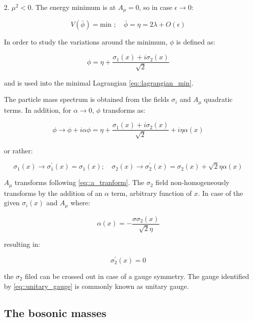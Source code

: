 2. $\mu^{2} < 0$. The energy minimum is at $A_{\mu} = 0$, so in  case $\epsilon \rightarrow 0$:

\begin{equation}
V(\bar{\phi}) = \text{min }; \quad \bar{\phi}=\eta= 2\lambda +O(\epsilon)
\end{equation}
 
 In order to study the  variations around the minimum, $\phi$ is defined as:

\begin{equation}
 \phi=\eta + \dfrac{\sigma_{1}(x) + i\sigma_{2}(x)}{\sqrt{2}} 
\end{equation}

and is used into the minimal Lagrangian \ref{eq::lagrangian_min}.

The particle mass spectrum is obtained from the fields $\sigma_{i}$ and $A_{\mu}$ quadratic terms. In addition, for $\alpha \rightarrow 0$, $\phi$ transforms as:

\begin{equation}
\phi \rightarrow \phi + i\alpha\phi = \eta + \dfrac{\sigma_{1}(x) + i\sigma_{2}(x)}{\sqrt{2}} + i\eta\alpha(x)
\end{equation}

or rather:

\begin{equation}
\sigma_{1}(x) \rightarrow \sigma^{\prime}_{1}(x) = \sigma_{1}(x); \quad \sigma_{2}(x) \rightarrow \sigma^{\prime}_{2}(x) = \sigma_{2}(x) + \sqrt{2}\eta\alpha(x)
\end{equation}

$A_{\mu}$ transforms following \autoref{eq::a_tranform}. The $\sigma_{2}$ field non-homogeneously transforms by the addition of an $\alpha$ term, arbitrary function of $x$. In case of the given $\sigma_{i}(x)$ and $A_{\mu}$ where:

\begin{equation}
\alpha(x) = -\dfrac{σ\sigma_{2}(x)}{\sqrt{2}\eta}
\end{equation}

resulting in:

\begin{equation}
\sigma^{\prime}_{2}(x) = 0
\label{eq::unitary_gauge}
\end{equation}

the $\sigma_{2}$ filed can be crossed out in case of a gauge symmetry. The gauge identified by \autoref{eq::unitary_gauge} is commonly known as unitary gauge.

\subsection{The bosonic masses}

